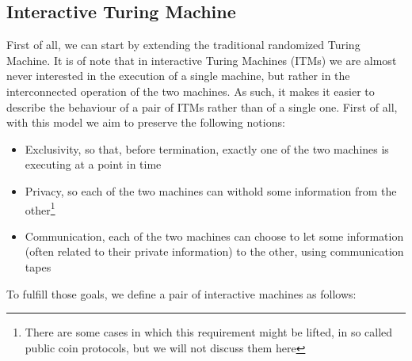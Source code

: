 \documentclass{article}
\begin{document}
\subsection{Interactive Turing Machine}
First of all, we can start by extending the traditional randomized Turing Machine. It is of note that in interactive Turing Machines (ITMs) we are almost never interested in the execution of a single machine, but rather in the interconnected operation of the two machines. As such, it makes it easier to describe the behaviour of a pair of ITMs rather than of a single one. First of all, with this model we aim to preserve the following notions:
\begin{itemize}
    \item Exclusivity, so that, before termination, exactly one of the two machines is executing at a point in time
    \item Privacy, so each of the two machines can withold some information from the other\footnote{There are some cases in which this requirement might be lifted, in so called public coin protocols, but we will not discuss them here}
    \item Communication, each of the two machines can choose to let some information (often related to their private information) to the other, using communication tapes
\end{itemize}
To fulfill those goals, we define a pair of interactive machines as follows:
\end{document}
